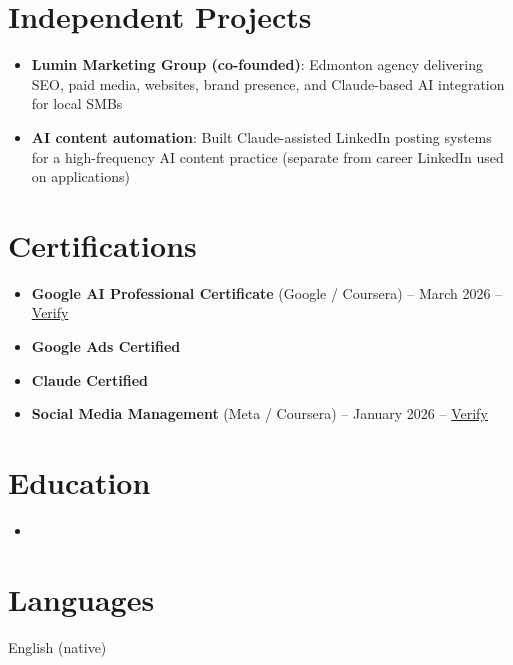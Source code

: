 \documentclass[11pt,a4paper,sans]{moderncv}
\begin{document}
\section{Independent Projects}
\vspace{1pt}
\begin{itemize}
\item \textbf{Lumin Marketing Group (co-founded)}: Edmonton agency delivering SEO, paid media, websites, brand presence, and Claude-based AI integration for local SMBs
\item \textbf{AI content automation}: Built Claude-assisted LinkedIn posting systems for a high-frequency AI content practice (separate from career LinkedIn used on applications)
\end{itemize}

\section{Certifications}
\vspace{1pt}
\begin{itemize}
\item \textbf{Google AI Professional Certificate} (Google / Coursera) -- March 2026 -- \href{https://www.coursera.org/account/accomplishments/verify/professional-cert/54E1P3RBHVL8}{Verify}
\item \textbf{Google Ads Certified}
\item \textbf{Claude Certified}
\item \textbf{Social Media Management} (Meta / Coursera) -- January 2026 -- \href{https://www.coursera.org/account/accomplishments/verify/7NOVGMU2L69G}{Verify}
\end{itemize}

\section{Education}
\vspace{1pt}
\begin{itemize}
\item{}
\end{itemize}

\section{Languages}
\vspace{1pt}
English (native)
\end{document}
